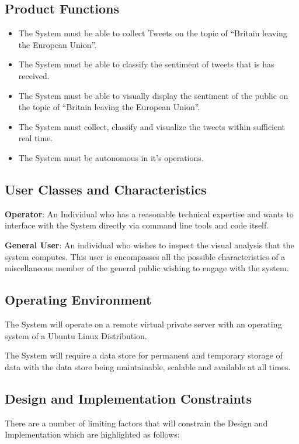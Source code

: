 \documentclass[11pt]{report}
\begin{document}
\subsection*{Product Functions}
\begin{itemize}
\item The System must be able to collect Tweets on the topic of ``Britain leaving the European Union''.
\item The System must be able to classify the sentiment of tweets that is has received.
\item The System must be able to visually display the sentiment of the public
on the topic of ``Britain leaving the European Union''.
\item The System must collect, classify and visualize the tweets within sufficient real time.
\item The System must be autonomous in it's operations.
\end{itemize}

\subsection*{User Classes and Characteristics}
\textbf{Operator}: An Individual who has a reasonable technical expertise and wants to interface with the System directly via command line tools and code itself.

\textbf{General User}: An individual who wishes to inspect the visual analysis that the system computes. This user is encompasses all the possible characteristics of a miscellaneous member of the general public wishing to engage with the system.

\subsection*{Operating Environment}
The System will operate on a remote virtual private server with an operating system of a Ubuntu Linux Distribution. 

The System will require a data store for permanent and temporary storage of data with the data store being maintainable, scalable and available at all times.

\subsection*{Design and Implementation Constraints}
There are a number of limiting factors that will constrain the Design and Implementation which are highlighted as follows:
\end{document}
